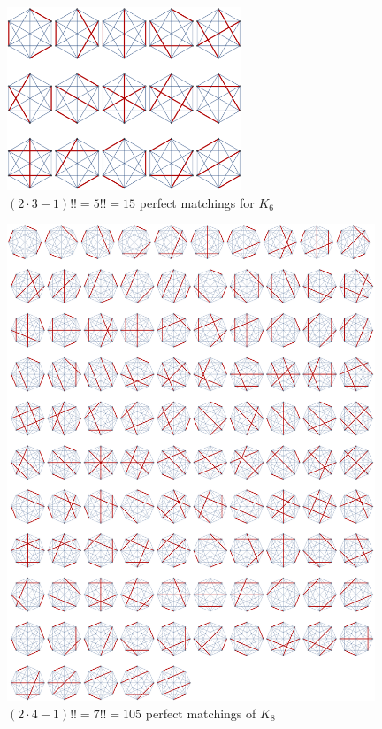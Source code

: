 \documentclass[12pt]{article}
\numberwithin{equation}{section}
\begin{document}
\begin{figure}[!htb]
    \centering
    \includegraphics[width=7cm]{Images/k6matching.png}
    \caption{$(2\cdot3-1)!!=5!!=15$ perfect matchings for $K_{6}$}
    \label{fig:k6matching}
\end{figure}
\begin{figure}[!htb]
    \centering
    \includegraphics[width=11cm]{Images/newk8perfectmatching.png}
    \caption{$(2\cdot4-1)!!=7!!=105$ perfect matchings of $K_{8}$}
    \label{fig:k8matching}
\end{figure}
\clearpage
\end{document}

